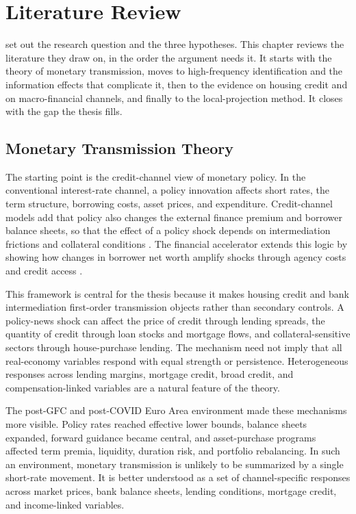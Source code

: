 \chapter{Literature Review}
\label{chap:literature}

 set out the research question and the three hypotheses. This chapter reviews the literature they draw on, in the order the argument needs it. It starts with the theory of monetary transmission, moves to high-frequency identification and the information effects that complicate it, then to the evidence on housing credit and on macro-financial channels, and finally to the local-projection method. It closes with the gap the thesis fills.

\section{Monetary Transmission Theory}

The starting point is the credit-channel view of monetary policy. In the conventional interest-rate channel, a policy innovation affects short rates, the term structure, borrowing costs, asset prices, and expenditure. Credit-channel models add that policy also changes the external finance premium and borrower balance sheets, so that the effect of a policy shock depends on intermediation frictions and collateral conditions \parencite{BernankeGertler1995}. The financial accelerator extends this logic by showing how changes in borrower net worth amplify shocks through agency costs and credit access \parencite{BernankeGertlerGilchrist1999}.

This framework is central for the thesis because it makes housing credit and bank intermediation first-order transmission objects rather than secondary controls. A policy-news shock can affect the price of credit through lending spreads, the quantity of credit through loan stocks and mortgage flows, and collateral-sensitive sectors through house-purchase lending. The mechanism need not imply that all real-economy variables respond with equal strength or persistence. Heterogeneous responses across lending margins, mortgage credit, broad credit, and compensation-linked variables are a natural feature of the theory.

The post-GFC and post-COVID Euro Area environment made these mechanisms more visible. Policy rates reached effective lower bounds, balance sheets expanded, forward guidance became central, and asset-purchase programs affected term premia, liquidity, duration risk, and portfolio rebalancing. In such an environment, monetary transmission is unlikely to be summarized by a single short-rate movement. It is better understood as a set of channel-specific responses across market prices, bank balance sheets, lending conditions, mortgage credit, and income-linked variables.

